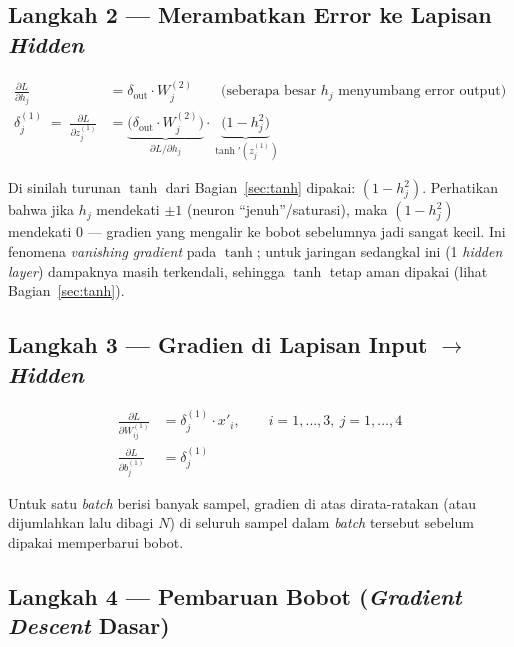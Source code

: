 \documentclass[11pt,a4paper]{article}
\begin{document}
\subsection{Langkah 2 --- Merambatkan Error ke Lapisan \emph{Hidden}}

\begin{formulabox}
\begin{align}
  \frac{\partial L}{\partial h_j} &= \delta_{\text{out}}\cdot W^{(2)}_j
  \qquad\text{(seberapa besar $h_j$ menyumbang error output)}\\[4pt]
  \delta^{(1)}_j \;=\; \frac{\partial L}{\partial z^{(1)}_j}
  &= \underbrace{\big(\delta_{\text{out}}\cdot W^{(2)}_j\big)}_{\partial L/\partial h_j}\cdot
  \underbrace{\big(1-h_j^{2}\big)}_{\tanh'(z^{(1)}_j)} \label{eq:delta1}
\end{align}
\end{formulabox}

Di sinilah turunan $\tanh$ dari Bagian~\ref{sec:tanh} dipakai: $(1-h_j^2)$. Perhatikan
bahwa jika $h_j$ mendekati $\pm1$ (neuron ``jenuh''/saturasi), maka $(1-h_j^2)$ mendekati
$0$ --- gradien yang mengalir ke bobot sebelumnya jadi sangat kecil. Ini fenomena
\emph{vanishing gradient} pada $\tanh$; untuk jaringan sedangkal ini (1 \emph{hidden
layer}) dampaknya masih terkendali, sehingga $\tanh$ tetap aman dipakai (lihat
Bagian~\ref{sec:tanh}).

\subsection{Langkah 3 --- Gradien di Lapisan Input $\to$ \emph{Hidden}}

\begin{formulabox}
\begin{align}
  \frac{\partial L}{\partial W^{(1)}_{ij}} &= \delta^{(1)}_j \cdot x'_i, \qquad i=1,\dots,3,\ j=1,\dots,4 \\
  \frac{\partial L}{\partial b^{(1)}_j} &= \delta^{(1)}_j
\end{align}
\end{formulabox}

Untuk satu \emph{batch} berisi banyak sampel, gradien di atas dirata-ratakan (atau
dijumlahkan lalu dibagi $N$) di seluruh sampel dalam \emph{batch} tersebut sebelum
dipakai memperbarui bobot.

\subsection{Langkah 4 --- Pembaruan Bobot (\emph{Gradient Descent} Dasar)}
\end{document}
